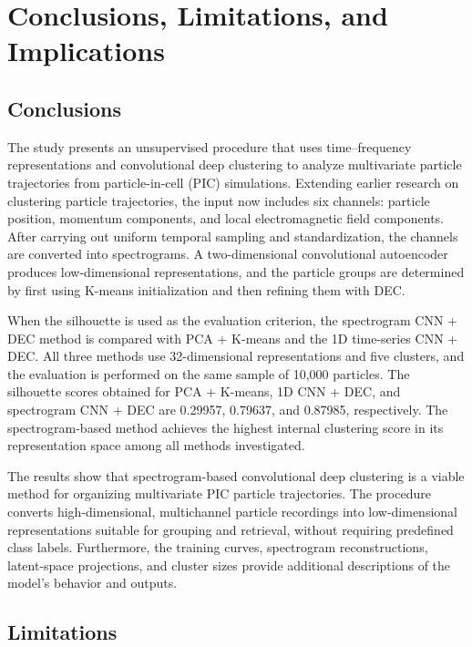 \section{Conclusions, Limitations, and Implications}\label{sec:conclusions}

\subsection{Conclusions}

The study presents an unsupervised procedure that uses time--frequency representations and convolutional deep clustering to analyze multivariate particle trajectories from particle-in-cell (PIC) simulations. Extending earlier research on clustering particle trajectories, the input now includes six channels: particle position, momentum components, and local electromagnetic field components. After carrying out uniform temporal sampling and standardization, the channels are converted into spectrograms. A two-dimensional convolutional autoencoder produces low-dimensional representations, and the particle groups are determined by first using K-means initialization and then refining them with DEC.

When the silhouette is used as the evaluation criterion, the spectrogram CNN + DEC method is compared with PCA + K-means and the 1D time-series CNN + DEC. All three methods use 32-dimensional representations and five clusters, and the evaluation is performed on the same sample of 10,000 particles. The silhouette scores obtained for PCA + K-means, 1D CNN + DEC, and spectrogram CNN + DEC are 0.29957, 0.79637, and 0.87985, respectively. The spectrogram-based method achieves the highest internal clustering score in its representation space among all methods investigated.

The results show that spectrogram-based convolutional deep clustering is a viable method for organizing multivariate PIC particle trajectories. The procedure converts high-dimensional, multichannel particle recordings into low-dimensional representations suitable for grouping and retrieval, without requiring predefined class labels. Furthermore, the training curves, spectrogram reconstructions, latent-space projections, and cluster sizes provide additional descriptions of the model's behavior and outputs.

\subsection{Limitations}

